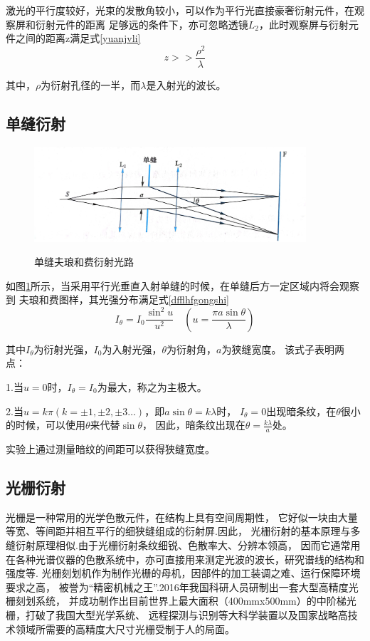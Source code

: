 \documentclass{ctexart}
\begin{document}
  激光的平行度较好，光束的发散角较小，可以作为平行光直接豪奢衍射元件，在观察屏和衍射元件的距离
  足够远的条件下，亦可忽略透镜$L_{2}$，此时观察屏与衍射元件之间的距离z满足式\ref{yuanjvli}
  \begin{equation}\label{yuanjvli}
    z>>\frac{\rho^{2}}{\lambda}
  \end{equation}

  其中，$\rho$为衍射孔径的一半，而$\lambda$是入射光的波长。

  \subsection{单缝衍射}
  \begin{figure}[H]
    \centering\label{dfguanglu}
    \includegraphics[width=0.9\textwidth,height=0.2\textheight]{dfguanglu.jpg}
    \caption{单缝夫琅和费衍射光路}
  \end{figure}
  如图\ref{dfguanglu}所示，当采用平行光垂直入射单缝的时候，在单缝后方一定区域内将会观察到
  夫琅和费图样，其光强分布满足式\ref{dfflhfgongshi}
  \begin{equation}\label{dfflhfgongshi}
    I_{\theta}=I_{0}\frac{\sin^{2}u}{u^{2}}\quad (u=\frac{\pi a \sin \theta}{\lambda})
  \end{equation}

  其中$I_{\theta}$为衍射光强，$I_{0}$为入射光强，$\theta$为衍射角，$a$为狭缝宽度。
  该式子表明两点：

  1.\quad 当$u=0$时，$I_{\theta}=I_{0}$为最大，称之为主极大。

  2.\quad 当$u=k\pi(k=\pm 1,\pm 2,\pm 3\dots)$，即$a\sin\theta=k\lambda$时，
    $I_{\theta}=0$出现暗条纹，在$\theta$很小的时候，可以使用$\theta$来代替$\sin\theta$，
    因此，暗条纹出现在$\theta=\frac{k\lambda}{a}$处。

  实验上通过测量暗纹的间距可以获得狭缝宽度。

  \subsection{光栅衍射}
  光栅是一种常用的光学色散元件，在结构上具有空间周期性，
  它好似一块由大量等宽、等间距并相互平行的细狭缝组成的衍射屏.因此，
  光栅衍射的基本原理与多缝衍射原理相似.由于光栅衍射条纹细锐、色散率大、分辨本领高，
  因而它通常用在各种光谱仪器的色散系统中，亦可直接用来测定光波的波长，研究谱线的结构和强度等.
  光栅刻划机作为制作光栅的母机，因部件的加工装调之难、运行保障环境要求之高，
  被誉为“精密机械之王”.2016年我国科研人员研制出一套大型高精度光栅刻划系统，
  并成功制作出目前世界上最大面积（400mmx500mm）的中阶梯光栅，打破了我国大型光学系统、
  远程探测与识别等大科学装置以及国家战略高技术领域所需要的高精度大尺寸光栅受制于人的局面。
\end{document}
